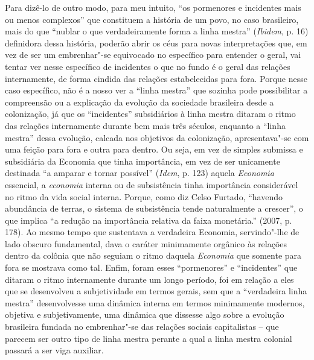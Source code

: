 {Para dizê-lo de outro modo, para meu intuito, ``os pormenores e
incidentes mais ou menos complexos'' que constituem a história de um
povo, no caso brasileiro, mais do que ``nublar o que verdadeiramente
forma a linha mestra'' (\emph{Ibidem}, p. 16) definidora dessa história,
poderão abrir os céus para novas interpretações que, em vez de ser um
embrenhar"-se equivocado no específico para entender o geral, vai tentar
ver nesse específico de incidentes o que no fundo é o geral das relações
internamente, de forma cindida das relações estabelecidas para fora.
Porque nesse caso específico, não é a nosso ver a ``linha mestra'' que
sozinha pode possibilitar a compreensão ou a explicação da evolução da
sociedade brasileira desde a colonização, já que os ``incidentes''
subsidiários à linha mestra ditaram o ritmo das relações internamente
durante bem mais três séculos, enquanto a ``linha mestra'' dessa
evolução, calcada nos objetivos da colonização, apresentava"-se com uma
feição para fora e outra para dentro. Ou seja, em vez de simples
submissa e subsidiária da Economia que tinha importância, em vez de ser
unicamente destinada ``a amparar e tornar possível'' (\emph{Idem}, p.
123) aquela \emph{Economia} essencial, a \emph{economia} interna ou de
subsistência tinha importância considerável no ritmo da vida social
interna. Porque, como diz Celso Furtado, ``havendo abundância de terras,
o sistema de subsistência tende naturalmente a crescer'', o que implica
``a redução na importância relativa da faixa monetária.'' (2007, p.
178). Ao mesmo tempo que sustentava a verdadeira Economia, servindo"-lhe
de lado obscuro fundamental, dava o caráter minimamente orgânico às
relações dentro da colônia que não seguiam o ritmo daquela
\emph{Economia} que somente para fora se mostrava como tal. Enfim, foram
esses ``pormenores'' e ``incidentes'' que ditaram o ritmo internamente
durante um longo período, foi em relação a eles que se desenvolveu a
subjetividade em termos gerais, sem que a ``verdadeira linha mestra''
desenvolvesse uma dinâmica interna em termos minimamente modernos,
objetiva e subjetivamente, uma dinâmica que dissesse algo sobre a
evolução brasileira fundada no embrenhar"-se das relações sociais
capitalistas -- que parecem ser outro tipo de linha mestra perante a
qual a linha mestra colonial passará a ser viga auxiliar.

}
